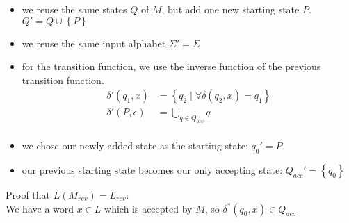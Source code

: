 \begin{itemize}
    \item we reuse the same states $Q$ of $M$, but add one new starting state $P$.\\
    $Q' = Q \cup \left\{P\right\}$
    \item we reuse the same input alphabet $\Sigma' = \Sigma$
    \item for the transition function, we use the inverse function of the previous transition function.\\
    \begin{align*}
        \delta'(q_{1}, x) &= \left\{q_{2}\mid \forall \delta(q_{2},x) = q_{1}\right\}\\
        \delta'(P, \epsilon) &= \bigcup_{q \in Q_{acc}} q\\
    \end{align*}
    \item we chose our newly added state as the starting state: $q_{0}' = P$
    \item our previous starting state becomes our only accepting state: $Q_{acc}' = \left\{q_{0}\right\}$
\end{itemize}
Proof that $L(M_{rev}) = L_{rev}$:\\
We have a word $x\in L$ which is accepted by $M$, so $\delta^{*}(q_{0},x)\in Q_{acc}$
